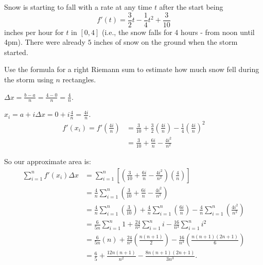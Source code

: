 \documentclass[handout, nooutcomes]{ximera}
\renewenvironment{freeResponse}{
\ifhandout\setbox0\vbox\bgroup\else
\begin{trivlist}\item[\hskip \labelsep\bfseries Solution:\hspace{2ex}]
\fi}
{\ifhandout\egroup\else
\end{trivlist}
\fi}
\begin{document}
				
	











\begin{problem}
Snow is starting to fall with a rate at any time $t$ after the start being 
$$ f'(t) = \frac{3}{2} t - \frac{1}{4} t^2 + \frac{3}{10} $$
inches per hour for $t$ in $[0,4]$ (i.e., the snow falls for 4 hours - from noon until 4pm).  
There were already $5$ inches of snow on the ground when the storm started.  
	\begin{enumerate}
	
	\item  Use the formula for a right Riemann sum to estimate how much snow fell during the storm using $n$ rectangles.
		\begin{freeResponse}
		$\Delta x = \frac{b-a}{n} = \frac{4-0}{n} = \frac{4}{n}$.
		
		$x_i = a + i \Delta x = 0 + i \frac{4}{n} = \frac{4i}{n}$.
			\begin{align*}
			f'(x_i) = f' \left( \frac{4i}{n} \right) &= \frac{3}{10} + \frac{3}{2} \left( \frac{4i}{n} \right) - \frac{1}{4} \left( \frac{4i}{n} \right)^2  \\
			&= \frac{3}{10} + \frac{6i}{n} - \frac{4i^2}{n^2}
			\end{align*}
			
		So our approximate area is:
			\begin{align*}
			\sum_{i=1}^n f'(x_i) \Delta x &= \sum_{i=1}^n \left[ \left( \frac{3}{10} + \frac{6i}{n} - \frac{4i^2}{n^2} \right) \left( \frac{4}{n} \right) \right]  \\
			&= \frac{4}{n} \sum_{i=1}^n \left( \frac{3}{10} + \frac{6i}{n} - \frac{4i^2}{n^2} \right)  \\
			&= \frac{4}{n} \sum_{i=1}^n \left( \frac{3}{10} \right) + \frac{4}{n} \sum_{i=1}^n \left( \frac{6i}{n} \right) - \frac{4}{n} \sum_{i=1}^n \left( \frac{4i^2}{n^2} \right)  \\
			&= \frac{6}{5n} \sum_{i=1}^n 1 + \frac{24}{n^2} \sum_{i=1}^n i - \frac{16}{n^3} \sum_{i=1}^n i^2  \\
			&= \frac{6}{5n} (n) + \frac{24}{n^2} \left( \frac{n(n+1)}{2} \right) - \frac{16}{n^3} \left( \frac{n(n+1)(2n+1)}{6} \right)  \\
			&= \frac{6}{5} + \frac{12n(n+1)}{n^2} - \frac{8n(n+1)(2n+1)}{3n^3}.
			\end{align*}
		\end{freeResponse}
		

\end{enumerate}
\end{problem}
\end{document}
